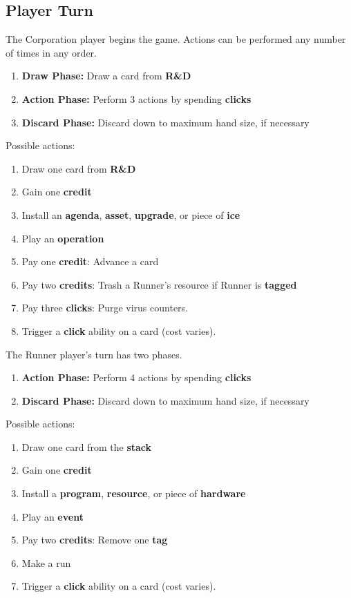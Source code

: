 \documentclass[12pt]{article}
\newenvironment{enumerateCustom}
{\begin{enumerate}
  \setlength{\itemsep}{1pt}
  \setlength{\parskip}{0pt}
  \setlength{\parsep}{0pt}}
{\end{enumerate}}
\begin{document}
\begin{multicols*}{2}
\section*{Player Turn}
The Corporation player begins the game. Actions can be performed any number of times in any order.
\begin{enumerateCustom}
	\item \textbf{Draw Phase:} Draw a card from \textbf{R\&D}
	\item \textbf{Action Phase:} Perform 3 actions by spending \textbf{clicks}
	\item \textbf{Discard Phase:} Discard down to maximum hand size, if necessary
\end{enumerateCustom}
Possible actions:
\begin{enumerateCustom}
	\item Draw one card from \textbf{R\&D}
	\item Gain one \textbf{credit}
	\item Install an \textbf{agenda}, \textbf{asset}, \textbf{upgrade}, or piece of \textbf{ice}
	\item Play an \textbf{operation}
	\item Pay one \textbf{credit}: Advance a card
	\item Pay two \textbf{credits}: Trash a Runner's resource if Runner is \textbf{tagged}
	\item Pay three \textbf{clicks}: Purge virus counters.
	\item Trigger a \textbf{click} ability on a card (cost varies).
\end{enumerateCustom}

The Runner player's turn has two phases.
\begin{enumerateCustom}
	\item \textbf{Action Phase:} Perform 4 actions by spending \textbf{clicks}
	\item \textbf{Discard Phase:} Discard down to maximum hand size, if necessary
\end{enumerateCustom}
Possible actions:
\begin{enumerateCustom}
	\item Draw one card from the \textbf{stack}
	\item Gain one \textbf{credit}
	\item Install a \textbf{program}, \textbf{resource}, or piece of \textbf{hardware}
	\item Play an \textbf{event}
	\item Pay two \textbf{credits}: Remove one \textbf{tag}
	\item Make a run
	\item Trigger a \textbf{click} ability on a card (cost varies).
\end{enumerateCustom}


\end{multicols*}
\end{document}
